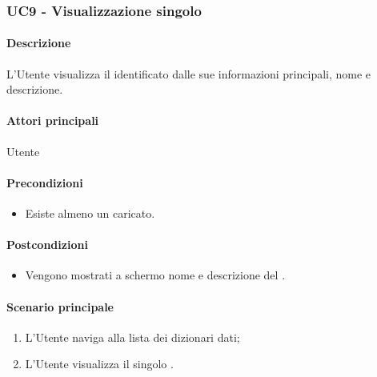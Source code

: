 \subsubsection{UC9 - Visualizzazione singolo }\label{UC9}
\paragraph*{Descrizione}
L’Utente visualizza il  identificato dalle sue informazioni principali, nome e descrizione.

\paragraph*{Attori principali}
Utente

\paragraph*{Precondizioni}
\begin{itemize}
  \item Esiste almeno un  caricato.  
\end{itemize}

\paragraph*{Postcondizioni}
\begin{itemize}
  \item Vengono mostrati a schermo nome e descrizione del .
\end{itemize}

\paragraph*{Scenario principale}
\begin{enumerate}
  \item L’Utente naviga alla lista dei dizionari dati;
  \item L’Utente visualizza il singolo .
\end{enumerate}
